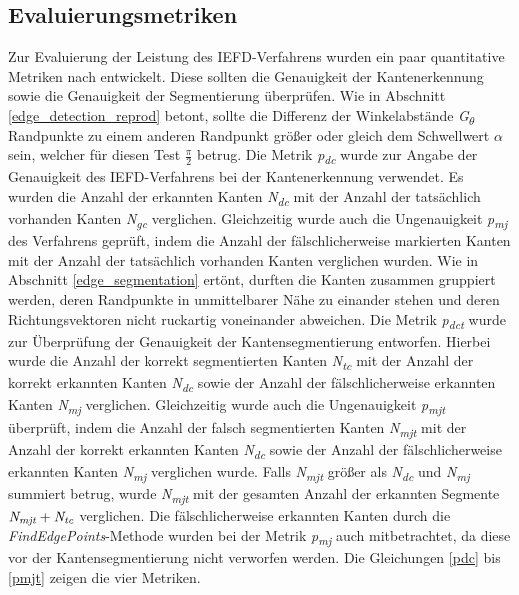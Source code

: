 \subsection{Evaluierungsmetriken} \label{evaluations_metrics}
Zur Evaluierung der Leistung des IEFD-Verfahrens wurden ein paar quantitative Metriken nach \textcite[10]{ni_edge_2016} entwickelt. Diese sollten die Genauigkeit der Kantenerkennung sowie die Genauigkeit der Segmentierung überprüfen. Wie in Abschnitt \ref{edge_detection_reprod} betont, sollte die Differenz der Winkelabstände \textit{G\textsubscript{$\theta$}} Randpunkte zu einem anderen Randpunkt größer oder gleich dem Schwellwert $\alpha$ sein, welcher für diesen Test $\frac{\pi}{2}$ betrug. Die Metrik \textit{p\textsubscript{dc}} wurde zur Angabe der Genauigkeit des IEFD-Verfahrens bei der Kantenerkennung verwendet. Es wurden die Anzahl der erkannten Kanten \textit{N\textsubscript{dc}} mit der Anzahl der tatsächlich vorhanden Kanten \textit{N\textsubscript{gc}} verglichen. Gleichzeitig wurde auch die Ungenauigkeit \textit{p\textsubscript{mj}} des Verfahrens geprüft, indem die Anzahl der fälschlicherweise markierten Kanten mit der Anzahl der tatsächlich vorhanden Kanten verglichen wurden. Wie in Abschnitt \ref{edge_segmentation} ertönt, durften die Kanten zusammen gruppiert werden, deren Randpunkte in unmittelbarer Nähe zu einander stehen und deren Richtungsvektoren nicht ruckartig voneinander abweichen. Die Metrik \textit{p\textsubscript{dct}} wurde zur Überprüfung der Genauigkeit der Kantensegmentierung entworfen. Hierbei wurde die Anzahl der korrekt segmentierten Kanten \textit{N\textsubscript{tc}} mit der Anzahl der korrekt erkannten Kanten \textit{N\textsubscript{dc}} sowie der Anzahl der fälschlicherweise erkannten Kanten \textit{N\textsubscript{mj}} verglichen. Gleichzeitig wurde auch die Ungenauigkeit \textit{p\textsubscript{mjt}} überprüft, indem die Anzahl der falsch segmentierten Kanten \textit{N\textsubscript{mjt}} mit der Anzahl der korrekt erkannten Kanten \textit{N\textsubscript{dc}} sowie der Anzahl der fälschlicherweise erkannten Kanten \textit{N\textsubscript{mj}} verglichen wurde. Falls \textit{N\textsubscript{mjt}} größer als \textit{N\textsubscript{dc}} und \textit{N\textsubscript{mj}} summiert betrug, wurde \textit{N\textsubscript{mjt}} mit der gesamten Anzahl der erkannten Segmente $\textit{N\textsubscript{mjt}} + \textit{N\textsubscript{tc}}$ verglichen. Die fälschlicherweise erkannten Kanten durch die \textit{FindEdgePoints}-Methode wurden bei der Metrik \textit{p\textsubscript{mj}} auch mitbetrachtet, da diese vor der Kantensegmentierung nicht verworfen werden. Die Gleichungen \ref{pdc} bis \ref{pmjt} zeigen die vier Metriken.

